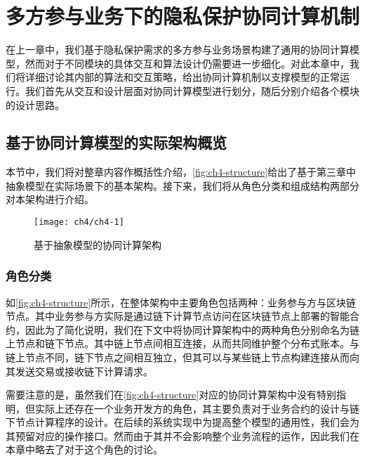 \chapter{多方参与业务下的隐私保护协同计算机制}
在上一章中，我们基于隐私保护需求的多方参与业务场景构建了通用的协同计算模型，然而对于不同模块的具体交互和算法设计仍需要进一步细化。对此本章中，我们将详细讨论其内部的算法和交互策略，给出协同计算机制以支撑模型的正常运行。我们首先从交互和设计层面对协同计算模型进行划分，随后分别介绍各个模块的设计思路。

\section{基于协同计算模型的实际架构概览}
本节中，我们将对整章内容作概括性介绍，\autoref{fig:ch4-structure}给出了基于第三章中抽象模型在实际场景下的基本架构。接下来，我们将从角色分类和组成结构两部分对本架构进行介绍。
\begin{figure}[htbp]
    \centering
    \texttt{[image: ch4/ch4-1]}
    \caption{\label{fig:ch4-structure}基于抽象模型的协同计算架构}
\end{figure}
\subsection{角色分类}
如\autoref{fig:ch4-structure}所示，在整体架构中主要角色包括两种：业务参与方与区块链节点。其中业务参与方实际是通过链下计算节点访问在区块链节点上部署的智能合约，因此为了简化说明，我们在下文中将协同计算架构中的两种角色分别命名为链上节点和链下节点。其中链上节点间相互连接，从而共同维护整个分布式账本。与链上节点不同，链下节点之间相互独立，但其可以与某些链上节点构建连接从而向其发送交易或接收链下计算请求。

需要注意的是，虽然我们在\autoref{fig:ch4-structure}对应的协同计算架构中没有特别指明，但实际上还存在一个业务开发方的角色，其主要负责对于业务合约的设计与链下节点计算程序的设计。在后续的系统实现中为提高整个模型的通用性，我们会为其预留对应的操作接口。然而由于其并不会影响整个业务流程的运作，因此我们在本章中略去了对于这个角色的讨论。

